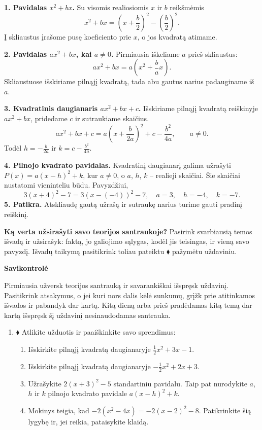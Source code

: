 \documentclass[12pt,a4paper]{article}
\newcommand{\svarbu}{\tikz[baseline=(zenklas.base)]\node[circle,draw=blue!50!black,line width=0.6pt,minimum size=4.5mm,inner sep=0pt,font=\sffamily\bfseries\small,text=blue!50!black] (zenklas) {!};}
\begin{document}
\begin{tcolorbox}[colback=blue!3,colframe=blue!40!black,boxrule=0.5pt,arc=1mm,colbacktitle=blue!8,coltitle=black,title={\svarbu\quad\bfseries Svarbiausios temos išvados}]
\textbf{1. Pavidalas $x^2+bx$.} Su visomis realiosiomis $x$ ir $b$ reikšmėmis
\[
x^2+bx=\left(x+\frac b2\right)^2-\left(\frac b2\right)^2.
\]
Į skliaustus įrašome pusę koeficiento prie $x$, o jos kvadratą atimame.

\textbf{2. Pavidalas $ax^2+bx$, kai $a\ne0$.} Pirmiausia iškeliame $a$ prieš skliaustus:
\[
ax^2+bx=a\left(x^2+\frac ba x\right).
\]
Skliaustuose išskiriame pilnąjį kvadratą, tada abu gautus narius padauginame iš $a$.

\textbf{3. Kvadratinis daugianaris $ax^2+bx+c$.} Išskiriame pilnąjį kvadratą reiškinyje $ax^2+bx$, pridedame $c$ ir sutraukiame skaičius.
\[
ax^2+bx+c=a\left(x+\frac b{2a}\right)^2+c-\frac{b^2}{4a},\qquad a\ne0.
\]
Todėl $h=-\frac b{2a}$ ir $k=c-\frac{b^2}{4a}$.

\textbf{4. Pilnojo kvadrato pavidalas.} Kvadratinį daugianarį galima užrašyti $P(x)=a(x-h)^2+k$, kur $a\ne0$, o $a$, $h$, $k$ – realieji skaičiai. Šie skaičiai nustatomi vieninteliu būdu. Pavyzdžiui,
\[
3(x+4)^2-7=3(x-(-4))^2-7,\quad a=3,\quad h=-4,\quad k=-7.
\]
\textbf{5. Patikra.} Atskliaudę gautą užrašą ir sutraukę narius turime gauti pradinį reiškinį.
\end{tcolorbox}
\textbf{Ką verta užsirašyti savo teorijos santraukoje?} Pasirink svarbiausią temos išvadą ir užsirašyk: faktą, jo galiojimo sąlygas, kodėl jis teisingas, ir vieną savo pavyzdį. Išvadų taikymą pasitikrink toliau pateiktu $\blacklozenge$ pažymėtu uždaviniu.
\newpage
\begin{center}{\Large\bfseries Savikontrolė}\end{center}
Pirmiausia užversk teorijos santrauką ir savarankiškai išspręsk uždavinį. Pasitikrink atsakymus, o jei kuri nors dalis kėlė sunkumų, grįžk prie atitinkamos išvados ir pabandyk dar kartą. Kitą dieną arba prieš pradėdamas kitą temą dar kartą išspręsk šį uždavinį nesinaudodamas santrauka.
\begin{enumerate}[resume]
\item $\blacklozenge$ Atlikite užduotis ir paaiškinkite savo sprendimus:
\begin{enumerate}
\item Išskirkite pilnąjį kvadratą daugianaryje $\frac12x^2+3x-1$.
\item Išskirkite pilnąjį kvadratą daugianaryje $-\frac12x^2+2x+3$.
\item Užrašykite $2(x+3)^2-5$ standartiniu pavidalu. Taip pat nurodykite $a$, $h$ ir $k$ pilnojo kvadrato pavidale $a(x-h)^2+k$.
\item Mokinys teigia, kad $-2(x^2-4x)=-2(x-2)^2-8$. Patikrinkite šią lygybę ir, jei reikia, pataisykite klaidą.
\end{enumerate}
\end{enumerate}
\end{document}
